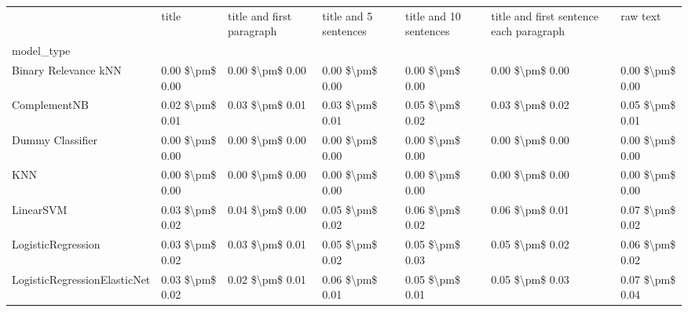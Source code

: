 \begin{tabular}{lllllll}
\toprule
{} &            title & title and first paragraph & title and 5 sentences & title and 10 sentences & title and first sentence each paragraph &         raw text \\
model\_type                      &                  &                           &                       &                        &                                         &                  \\
\midrule
Binary Relevance kNN            &  0.00 \$\textbackslash pm\$ 0.00 &           0.00 \$\textbackslash pm\$ 0.00 &       0.00 \$\textbackslash pm\$ 0.00 &        0.00 \$\textbackslash pm\$ 0.00 &                         0.00 \$\textbackslash pm\$ 0.00 &  0.00 \$\textbackslash pm\$ 0.00 \\
ComplementNB                    &  0.02 \$\textbackslash pm\$ 0.01 &           0.03 \$\textbackslash pm\$ 0.01 &       0.03 \$\textbackslash pm\$ 0.01 &        0.05 \$\textbackslash pm\$ 0.02 &                         0.03 \$\textbackslash pm\$ 0.02 &  0.05 \$\textbackslash pm\$ 0.01 \\
Dummy Classifier                &  0.00 \$\textbackslash pm\$ 0.00 &           0.00 \$\textbackslash pm\$ 0.00 &       0.00 \$\textbackslash pm\$ 0.00 &        0.00 \$\textbackslash pm\$ 0.00 &                         0.00 \$\textbackslash pm\$ 0.00 &  0.00 \$\textbackslash pm\$ 0.00 \\
KNN                             &  0.00 \$\textbackslash pm\$ 0.00 &           0.00 \$\textbackslash pm\$ 0.00 &       0.00 \$\textbackslash pm\$ 0.00 &        0.00 \$\textbackslash pm\$ 0.00 &                         0.00 \$\textbackslash pm\$ 0.00 &  0.00 \$\textbackslash pm\$ 0.00 \\
LinearSVM                       &  0.03 \$\textbackslash pm\$ 0.02 &           0.04 \$\textbackslash pm\$ 0.00 &       0.05 \$\textbackslash pm\$ 0.02 &        0.06 \$\textbackslash pm\$ 0.02 &                         0.06 \$\textbackslash pm\$ 0.01 &  0.07 \$\textbackslash pm\$ 0.02 \\
LogisticRegression              &  0.03 \$\textbackslash pm\$ 0.02 &           0.03 \$\textbackslash pm\$ 0.01 &       0.05 \$\textbackslash pm\$ 0.02 &        0.05 \$\textbackslash pm\$ 0.03 &                         0.05 \$\textbackslash pm\$ 0.02 &  0.06 \$\textbackslash pm\$ 0.02 \\
LogisticRegressionElasticNet    &  0.03 \$\textbackslash pm\$ 0.02 &           0.02 \$\textbackslash pm\$ 0.01 &       0.06 \$\textbackslash pm\$ 0.01 &        0.05 \$\textbackslash pm\$ 0.01 &                         0.05 \$\textbackslash pm\$ 0.03 &  0.07 \$\textbackslash pm\$ 0.04 \\

\end{tabular}

